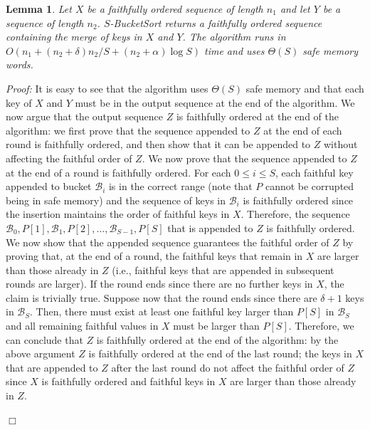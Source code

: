 \documentclass[review,number]{elsarticle}
\newcommand{\BO}[1]{{O}\left(#1\right)}
\newcommand{\BT}[1]{{\Theta}\left(#1\right)}
\newtheorem{lemma}{Lemma}
\renewenvironment{proof}{\begin{trivlist}
                         \item[] {\em Proof:}}{\hfill $\Box$
                       \end{trivlist}}
\newcommand{\B}{\mathcal{B}}
\newcommand{\SBucketSort}{$S$-\textsf{BucketSort}}
\begin{document}
\begin{lemma}\label{lem:bucket}
Let $X$ be a faithfully ordered sequence of length $n_1$ and let $Y$ be a
sequence of length $n_2$. \SBucketSort{} returns a faithfully ordered sequence
containing the merge of keys in $X$ and $Y$. The algorithm runs in
$\BO{n_1+(n_2+\delta)n_2/S + (n_2+\alpha) \log S}$ time and uses  $\BT{S}$ safe
memory words.
\end{lemma}
\begin{proof}
It is easy to see that the algorithm uses $\BT{S}$ safe memory and that each key
of $X$ and $Y$  must be in the output sequence at the end of the algorithm. We
now argue that the output sequence $Z$ is faithfully ordered at the end of the
algorithm: we first prove that the sequence appended to $Z$ at the end of each
round is faithfully ordered, and then  show that it can be appended to $Z$
without affecting the faithful order of $Z$. 
We now prove that the sequence
appended to $Z$ at the end of a round  is faithfully ordered. For each $0\leq i
\leq S$, each faithful key appended to bucket $\B_i$ is in the correct range
(note that $P$ cannot be corrupted being in safe memory) and the sequence of
keys in $\B_i$ is faithfully ordered since the insertion maintains the order  of
faithful keys in $X$. Therefore, the sequence $\B_0, P[1], \B_1, P[2],\ldots,
\B_{S-1}, P[S]$ that is appended to $Z$ is faithfully ordered. We now show that
the appended sequence guarantees the faithful order of $Z$ by proving that, at
the end of a round, the  faithful keys that remain in $X$ are larger than
those already in $Z$ (i.e., faithful keys that are appended in subsequent rounds
are larger). If the round ends since there are no further keys in $X$, the
claim is trivially true. Suppose now that the round ends since there are
$\delta+1$ keys in $\B_S$. Then, there must exist at least one faithful key
larger than $P[S]$ in $\B_S$ and all remaining faithful values in $X$ must be
larger than $P[S]$. Therefore, we can conclude that $Z$ is faithfully
ordered at the end of the algorithm: by the above argument $Z$ is faithfully
ordered at the end of the last round; the keys in $X$ that are appended to $Z$
after the last round do not affect the faithful order of $Z$ since  $X$ is
faithfully ordered and faithful keys in $X$ are larger than those already in
$Z$.


\end{proof}
\end{document}
